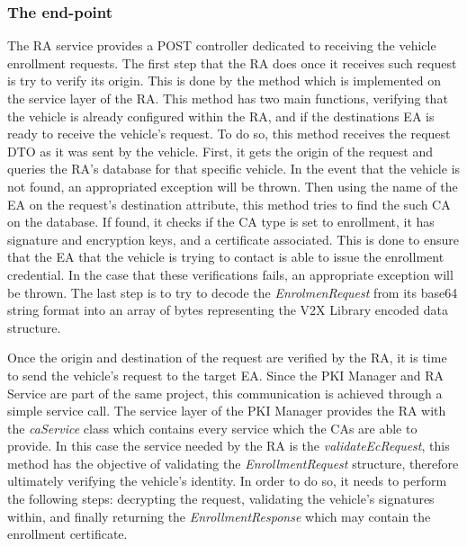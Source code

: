 \subsubsection{The end-point}
The RA service provides a POST controller dedicated to receiving the vehicle enrollment requests. The first step that the RA does once it receives such request is try to verify its origin. This is done by the  method which is implemented on the service layer of the RA. This method has two main functions, verifying that the vehicle is already configured within the RA, and if the destinations EA is ready to receive the vehicle's request. To do so, this method receives the request DTO as it was sent by the vehicle. First, it gets the origin of the request and queries the RA's database for that specific vehicle. In the event that the vehicle is not found, an appropriated exception will be thrown. Then using the name of the EA on the request's destination attribute, this method tries to find the such CA on the database. If found, it checks if the CA type is set to enrollment, it has signature and encryption keys, and a certificate associated. This is done to ensure that the EA that the vehicle is trying to contact is able to issue the enrollment credential. In the case that these verifications fails, an appropriate exception will be thrown. The last step is to try to decode the \textit{EnrolmenRequest} from its base64 string format into an array of bytes representing the V2X Library encoded data structure. 

Once the origin and destination of the request are verified by the RA, it is time to send the vehicle's request to the target EA. Since the PKI Manager and RA Service are part of the same project, this communication is achieved through a simple service call. The service layer of the PKI Manager provides the RA with the \textit{caService} class which contains every service which the CAs are able to provide. In this case the service needed by the RA is the \textit{validateEcRequest}, this method has the objective of validating the \textit{EnrollmentRequest} structure, therefore ultimately verifying the vehicle's identity. In order to do so, it needs to perform the following steps: decrypting the request, validating the vehicle's signatures within, and finally returning the \textit{EnrollmentResponse} which may contain the enrollment certificate. 

